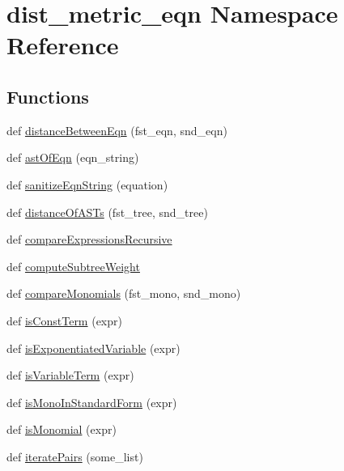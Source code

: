 \hypertarget{namespacedist__metric__eqn}{}\section{dist\+\_\+metric\+\_\+eqn Namespace Reference}
\label{namespacedist__metric__eqn}
\subsection*{Functions}
\begin{DoxyCompactItemize}
\item 
def \hyperlink{namespacedist__metric__eqn_ab4def04a832b446de3b516010c9d25c8}{distance\+Between\+Eqn} (fst\+\_\+eqn, snd\+\_\+eqn)
\item 
def \hyperlink{namespacedist__metric__eqn_a7c272f023cb7f03d89b02abfbe1e3db4}{ast\+Of\+Eqn} (eqn\+\_\+string)
\item 
def \hyperlink{namespacedist__metric__eqn_a0edcc8b6da256e87db3a3be211edd30c}{sanitize\+Eqn\+String} (equation)
\item 
def \hyperlink{namespacedist__metric__eqn_a885aa0745926a86faa53586adf1b96cd}{distance\+Of\+A\+S\+Ts} (fst\+\_\+tree, snd\+\_\+tree)
\item 
def \hyperlink{namespacedist__metric__eqn_a1257cacac74473c011cd73cc9ab42662}{compare\+Expressions\+Recursive}
\item 
def \hyperlink{namespacedist__metric__eqn_acc471149507b72a3ae90479ce8d1d530}{compute\+Subtree\+Weight}
\item 
def \hyperlink{namespacedist__metric__eqn_a1ed3fe178511ac2221f10e8b265616de}{compare\+Monomials} (fst\+\_\+mono, snd\+\_\+mono)
\item 
def \hyperlink{namespacedist__metric__eqn_a3c77142a78935fdb677e08c99072f75f}{is\+Const\+Term} (expr)
\item 
def \hyperlink{namespacedist__metric__eqn_a4b224f351734acf574055f60fe2414f9}{is\+Exponentiated\+Variable} (expr)
\item 
def \hyperlink{namespacedist__metric__eqn_a9accdb032b41a2b1f4c7d670140ff5d2}{is\+Variable\+Term} (expr)
\item 
def \hyperlink{namespacedist__metric__eqn_ab5f8a8fe7e017ea46cf425f103f9c745}{is\+Mono\+In\+Standard\+Form} (expr)
\item 
def \hyperlink{namespacedist__metric__eqn_adfb57d0eb8cb656d890cfeac71aff1dd}{is\+Monomial} (expr)
\item 
def \hyperlink{namespacedist__metric__eqn_a23d8ec2868beb4e11d36b4611e2c7f6e}{iterate\+Pairs} (some\+\_\+list)

\end{DoxyCompactItemize}
